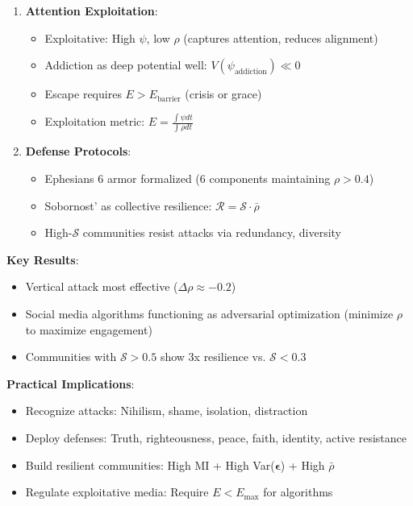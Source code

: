 \documentclass[11pt,a4paper]{article}
\theoremstyle{definition}
\theoremstyle{remark}
\begin{document}
\begin{small}
\begin{enumerate}
\begin{protocol}
\begin{mdframed}[backgroundcolor=green!10,linewidth=2pt,linecolor=green!70!black]
\begin{enumerate}[nosep]
    \item \textbf{Attention Exploitation}:
        \begin{itemize}[nosep]
            \item Exploitative: High \(\psi\), low \(\rho\) (captures attention, reduces alignment)
            \item Addiction as deep potential well: \(V(\psi_{\text{addiction}}) \ll 0\)
            \item Escape requires \(E > E_{\text{barrier}}\) (crisis or grace)
            \item Exploitation metric: \(E = \frac{\int \psi dt}{\int \rho dt}\)
        \end{itemize}
    
    \item \textbf{Defense Protocols}:
        \begin{itemize}[nosep]
            \item Ephesians 6 armor formalized (6 components maintaining \(\rho > 0.4\))
            \item Sobornost' as collective resilience: \(\mathcal{R} = \mathcal{S} \cdot \bar{\rho}\)
            \item High-\(\mathcal{S}\) communities resist attacks via redundancy, diversity
        \end{itemize}
\end{enumerate}

\textbf{Key Results}:
\begin{itemize}[nosep]
    \item Vertical attack most effective (\(\Delta\rho \approx -0.2\))
    \item Social media algorithms functioning as adversarial optimization (minimize \(\rho\) to maximize engagement)
    \item Communities with \(\mathcal{S} > 0.5\) show 3x resilience vs. \(\mathcal{S} < 0.3\)
\end{itemize}

\textbf{Practical Implications}:
\begin{itemize}[nosep]
    \item Recognize attacks: Nihilism, shame, isolation, distraction
    \item Deploy defenses: Truth, righteousness, peace, faith, identity, active resistance
    \item Build resilient communities: High MI + High Var(\(\boldsymbol{\epsilon}\)) + High \(\bar{\rho}\)
    \item Regulate exploitative media: Require \(E < E_{\max}\) for algorithms
\end{itemize}


\end{mdframed}
\end{protocol}
\end{enumerate}
\end{small}
\end{document}
